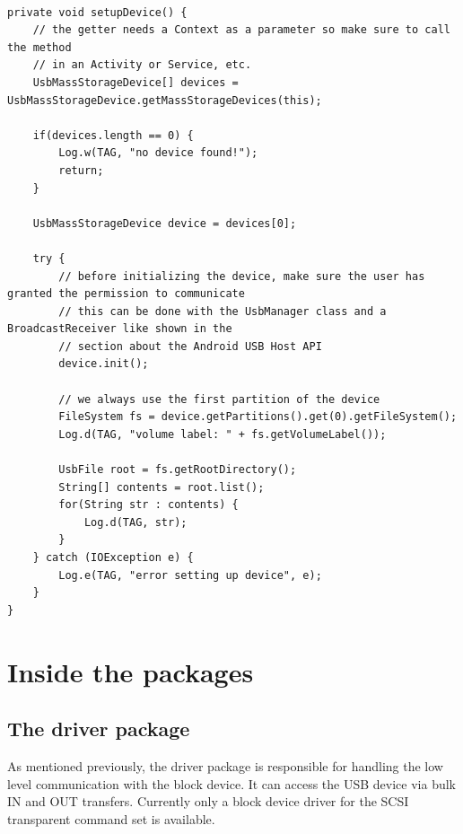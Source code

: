 \lstset{language=Java}
\begin{lstlisting}[caption=Code example for accessing the contents of a mass storage device, label=listing:main_example]

private void setupDevice() {
    // the getter needs a Context as a parameter so make sure to call the method
    // in an Activity or Service, etc.
    UsbMassStorageDevice[] devices = UsbMassStorageDevice.getMassStorageDevices(this);
    		
    if(devices.length == 0) {
        Log.w(TAG, "no device found!");
        return;
    }
	
    UsbMassStorageDevice device = devices[0];
	
    try {
        // before initializing the device, make sure the user has granted the permission to communicate
        // this can be done with the UsbManager class and a BroadcastReceiver like shown in the
        // section about the Android USB Host API
        device.init();
		
        // we always use the first partition of the device
        FileSystem fs = device.getPartitions().get(0).getFileSystem();
        Log.d(TAG, "volume label: " + fs.getVolumeLabel());
		
        UsbFile root = fs.getRootDirectory();
        String[] contents = root.list();
        for(String str : contents) {
            Log.d(TAG, str);
        }
    } catch (IOException e) {
        Log.e(TAG, "error setting up device", e);
    }
}
\end{lstlisting}

\chapter{Inside the packages}

\section{The driver package}

As mentioned previously, the driver package is responsible for handling the low level communication with the block device. It can access the USB device via bulk IN and OUT transfers. Currently only a block device driver for the SCSI transparent command set is available.

